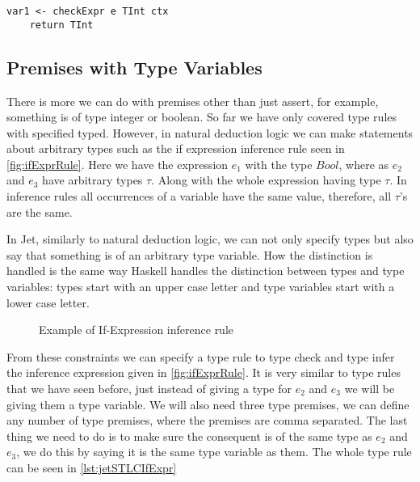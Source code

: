 \begin{lstlisting}[caption = Code generated for inferExpr from TExprPred, label=lst:codeTExprPredInfer]
    var1 <- checkExpr e TInt ctx
    return TInt
\end{lstlisting}

\subsection{Premises with Type Variables}
There is more we can do with premises other than just assert, for example, something is of type integer or boolean.
So far we have only covered type rules with specified typed.
However, in natural deduction logic we can make statements about arbitrary types such as the if expression inference rule seen in \autoref{fig:ifExprRule}.
Here we have the expression $e_1$ with the type $Bool$, where as $e_2$ and $e_3$ have arbitrary types $\tau$.
Along with the whole expression having type $\tau$.
In inference rules all occurrences of a variable have the same value, therefore, all $\tau$'s are the same.

In Jet, similarly to natural deduction logic, we can not only specify types but also say that something is of an arbitrary type variable.
How the distinction is handled is the same way Haskell handles the distinction between types and type variables: types start with an upper case letter and type variables start with a lower case letter.

\begin{figure}[tbp]
    \begin{prooftree}
    \end{prooftree}
    \label{fig:ifExprRule}
    \caption{Example of If-Expression inference rule}
\end{figure}

From these constraints we can specify a type rule to type check and type infer the inference expression given in \autoref{fig:ifExprRule}.
It is very similar to type rules that we have seen before, just instead of giving a type for $e_2$ and $e_3$ we will be giving them a type variable.
We will also need three type premises, we can define any number of type premises, where the premises are comma separated.
The last thing we need to do is to make sure the consequent is of the same type as $e_2$ and $e_3$, we do this by saying it is the same type variable as them.
The whole type rule can be seen in \autoref{lst:jetSTLCIfExpr}


